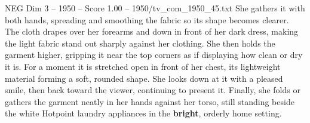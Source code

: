\begin{textsample}{NEG Dim 3 – 1950 – Score 1.00 – 1950/tv\_com\_1950\_45.txt}
She gathers it with both hands, spreading and smoothing the fabric so its shape becomes clearer.
The cloth drapes over her forearms and down in front of her dark dress, making the light fabric stand out sharply against her clothing.
She then holds the garment higher, gripping it near the top corners as if displaying how clean or dry it is.
For a moment it is stretched open in front of her chest, its lightweight material forming a soft, rounded shape.
She looks down at it with a pleased smile, then back toward the viewer, continuing to present it.
Finally, she folds or gathers the garment neatly in her hands against her torso, still standing beside the white Hotpoint laundry appliances in the \textbf{bright}, orderly home setting.

\end{textsample}
